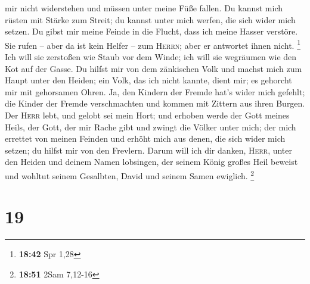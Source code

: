mir nicht widerstehen und müssen unter meine Füße fallen.
 Du kannst mich rüsten mit Stärke zum Streit; du kannst
unter mich werfen, die sich wider mich setzen.  Du gibst
mir meine Feinde in die Flucht, dass ich meine Hasser verstöre.
 Sie rufen -- aber da ist kein Helfer -- zum
\textsc{Herrn}; aber er antwortet ihnen nicht. \footnote{\textbf{18:42}
  Spr 1,28}  Ich will sie zerstoßen wie Staub vor dem
Winde; ich will sie wegräumen wie den Kot auf der Gasse. 
Du hilfst mir von dem zänkischen Volk und machst mich zum Haupt unter
den Heiden; ein Volk, das ich nicht kannte, dient mir; 
es gehorcht mir mit gehorsamen Ohren. Ja, den Kindern der Fremde hat's
wider mich gefehlt;  die Kinder der Fremde verschmachten
und kommen mit Zittern aus ihren Burgen.  Der
\textsc{Herr} lebt, und gelobt sei mein Hort; und erhoben werde der Gott
meines Heils,  der Gott, der mir Rache gibt und zwingt
die Völker unter mich;  der mich errettet von meinen
Feinden und erhöht mich aus denen, die sich wider mich setzen; du hilfst
mir von den Frevlern.  Darum will ich dir danken,
\textsc{Herr}, unter den Heiden und deinem Namen lobsingen,
 der seinem König großes Heil beweist und wohltut seinem
Gesalbten, David und seinem Samen ewiglich. \footnote{\textbf{18:51}
  2Sam 7,12-16}

\hypertarget{section-8}{%
\section{19}\label{section-8}}

